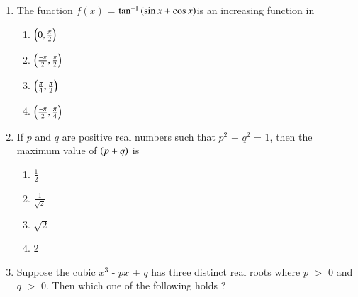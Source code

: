 \documentclass[journal,12pt,onecolumn]{IEEEtran}
\theoremstyle{remark}
\begin{document}
\begin{enumerate}
\begin{multicols}{4}
\begin{enumerate}
        \end{enumerate}
        \end{multicols}
            
        \item The function $f(x)$ = $\tan^{-1}\left(\sin{x} + \cos{x}\right)$is an increasing function in \hfill{}
         \begin{multicols}{4}
    
        \begin{enumerate}
        
            
        
      \item $\left(0,\frac{\pi}{2}\right)$
        \item $\left(\frac{-\pi}{2},\frac{\pi}{2}\right)$
        \item $\left(\frac{\pi}{4},\frac{\pi}{2}\right)$
        \item $\left(\frac{-\pi}{2},\frac{\pi}{4}\right)$
        
            
        
            
        
        \end{enumerate}
        \end{multicols}
            
        \item If $p$ and $q$ are positive real numbers such that $p^2$ + $q^2$ = 1, then the maximum value of $\left(p + q\right)$ is\hfill{}
         \begin{multicols}{4}
        \begin{enumerate}
        
            

        \item $\frac{1}{2}$
        \item $\frac{1}{\sqrt{2}}$
        \item $\sqrt{2}$
        \item 2
        \end{enumerate}
        \end{multicols}
            
        \item Suppose the cubic $x^3$ - $p$$x$ + $q$ has three distinct real roots where $p$ $>$ 0 and $q$ $>$ 0. Then which one of the following holds ? \hfill{}
         
        \begin{enumerate}
        
            
        

\end{enumerate}
\end{enumerate}
\end{document}
